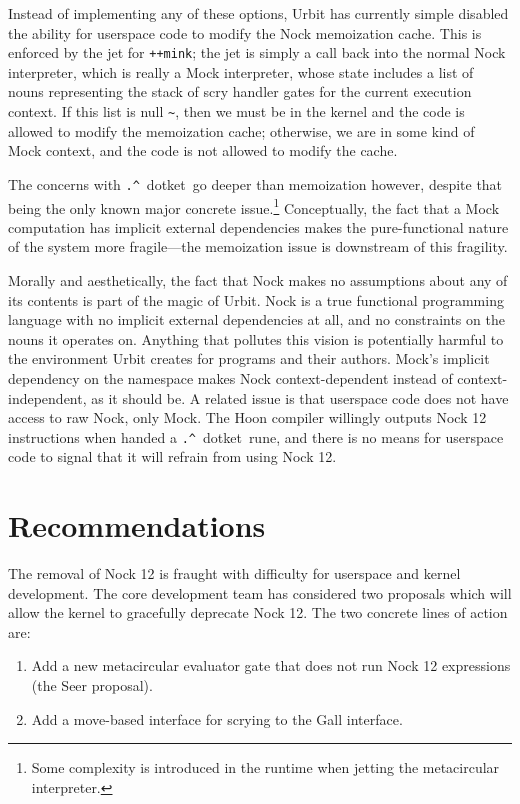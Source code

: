 \documentclass[twoside]{article}
\newcommand{\dotket}{\texttt{\string.\string^}~dotket}
\begin{document}
\noindent
Instead of implementing any of these options, Urbit has currently simple disabled the ability for userspace code to modify the Nock memoization cache.  This is enforced by the jet for \texttt{++mink}; the jet is simply a call back into the normal Nock interpreter, which is really a Mock interpreter, whose state includes a list of nouns representing the stack of scry handler gates for the current execution context.  If this list is null \texttt{\textasciitilde}, then we must be in the kernel and the code is allowed to modify the memoization cache; otherwise, we are in some kind of Mock context, and the code is not allowed to modify the cache.

The concerns with \dotket~go deeper than memoization however, despite that being the only known major concrete issue.\footnote{Some complexity is introduced in the runtime when jetting the metacircular interpreter.}  Conceptually, the fact that a Mock computation has implicit external dependencies makes the pure-functional nature of the system more fragile—the memoization issue is downstream of this fragility.

Morally and aesthetically, the fact that Nock makes no assumptions about any of its contents is part of the magic of Urbit.  Nock is a true functional programming language with no implicit external dependencies at all, and no constraints on the nouns it operates on.  Anything that pollutes this vision is potentially harmful to the environment Urbit creates for programs and their authors.  Mock's implicit dependency on the namespace makes Nock context-dependent instead of context-independent, as it should be.  A related issue is that userspace code does not have access to raw Nock, only Mock.  The Hoon compiler willingly outputs Nock 12 instructions when handed a \dotket~rune, and there is no means for userspace code to signal that it will refrain from using Nock 12.


\section{Recommendations}

The removal of Nock 12 is fraught with difficulty for userspace and kernel development.  The core development team has considered two proposals which will allow the kernel to gracefully deprecate Nock 12.  The two concrete lines of action are:

\begin{enumerate}
  \item  Add a new metacircular evaluator gate that does not run Nock 12 expressions (the Seer proposal).
  \item  Add a move-based interface for scrying to the Gall interface.
\end{enumerate}
\end{document}
